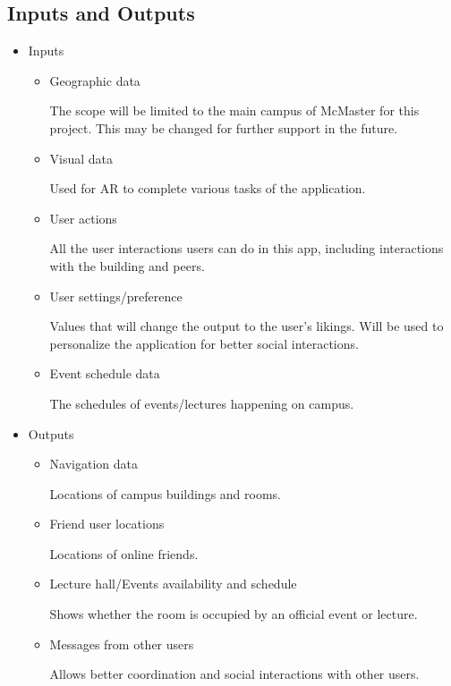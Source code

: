 \documentclass{article}
\begin{document}
\subsection{Inputs and Outputs}
\begin{itemize}
    \item Inputs
    \begin{itemize}
        \item Geographic data

        \quad The scope will be limited to the main campus of McMaster for this project. This may be changed for further support in the future.

        \item Visual data

        \quad Used for AR to complete various tasks of the application.
        
        \item User actions 

        \quad All the user interactions users can do in this app, including interactions with the building and peers.

        \item User settings/preference

        \quad Values that will change the output to the user's likings. Will be used to personalize the application for better social interactions.
        
        \item Event schedule data 

        \quad The schedules of events/lectures happening on campus.

    \end{itemize}
    \item Outputs
    \begin{itemize}
        \item Navigation data
        
        \quad Locations of campus buildings and rooms.
        
        \item Friend user locations

        \quad Locations of online friends.
        
        \item Lecture hall/Events availability and schedule

        \quad Shows whether the room is occupied by an official event or lecture.
        
        \item Messages from other users

        \quad Allows better coordination and social interactions with other users.
    \end{itemize}
\end{itemize}
\end{document}
